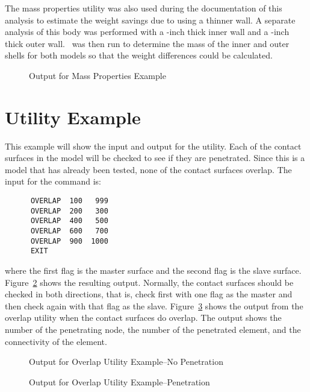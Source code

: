 The mass properties utility was also used during the documentation of
this analysis to estimate the weight savings due to using a thinner
wall.  A separate analysis of this body was performed with a
-inch thick inner wall and a -inch thick outer wall.
\numbers\ was then run to determine the mass of the inner and outer
shells for both models so that the weight differences could be
calculated.

\begin{figure}

\caption{Output for Mass Properties Example}\label{exmassout}
\end{figure}

\section{ Utility Example}
This example will show the input and output for the 
utility.  Each of the contact surfaces in the model will be checked to
see if they are penetrated.  Since this is a model that has already been
tested, none of the contact surfaces overlap.
The input for the command is:

\begin{verbatim}
      OVERLAP  100   999
      OVERLAP  200   300
      OVERLAP  400   500
      OVERLAP  600   700
      OVERLAP  900  1000
      EXIT
\end{verbatim}

where the first flag is the master surface and the second flag is the
slave surface. Figure~\ref{exoverlapout} shows the resulting output.
Normally, the contact surfaces should be checked in both directions,
that is, check first with one flag as the master and then check again
with that flag as the slave.  Figure~\ref{exoverlap2} shows the output
from the overlap utility when the contact surfaces do overlap.  The
output shows the number of the penetrating node, the number of the
penetrated element, and the connectivity of the element.

\begin{figure}

\caption{Output for Overlap Utility Example--No
Penetration}\label{exoverlapout}
\end{figure}

\begin{figure}

\caption{Output for Overlap Utility
Example--Penetration}\label{exoverlap2}
\end{figure}

